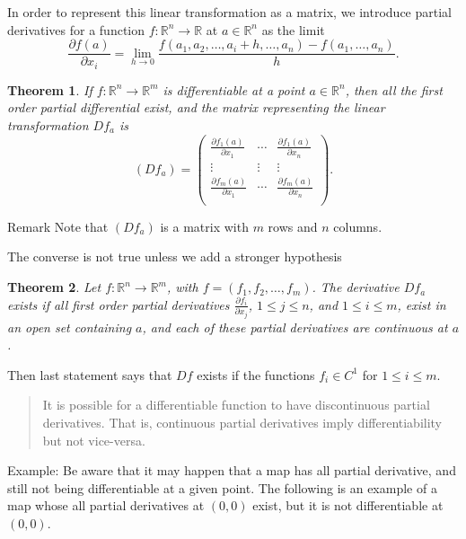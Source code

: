 \documentclass{amsart}
\newtheorem{thm}{Theorem}
\begin{document}
In order to represent this linear transformation as a matrix, we introduce partial derivatives for a function \(f: \mathbb{R}^n \to \mathbb{R}\) at \(a \in \mathbb{R}^n\) as the limit
\[ \frac{\partial f(a)}{\partial x_i} = \lim_{h\to 0} \frac{f(a_1,a_2,\ldots, a_i + h, \ldots, a_n) - f(a_1,\ldots, a_n)}{h}.\]


\begin{thm}
If \(f:\mathbb{R}^n \to \mathbb{R}^m\) is differentiable at a point \(a\in \mathbb{R}^n\), then all the first order partial differential exist, and the matrix representing the linear transformation \(Df_a\) is 
\[ (Df_a) = \left( \begin{array}{ccc}
\frac{\partial f_1(a)}{\partial x_1} & \cdots & \frac{\partial f_1(a)}{\partial x_n}\\
\vdots & \vdots & \vdots  \\
\frac{\partial f_m(a)}{\partial x_1} & \cdots & \frac{\partial f_m(a)}{\partial x_n}\\
\end{array} \right). \]
\end{thm}

\alert{Remark} Note that \((Df_a)\)  is a matrix with \(m\) rows and \(n\) columns.

The converse is not true unless we add a stronger hypothesis 

\begin{thm}
Let \(f:\mathbb{R}^n \to \mathbb{R}^m\), with \(f= (f_1,f_2,\ldots,f_m)\). The derivative  \(Df_a\) exists if all first order partial derivatives \(\frac{\partial f_i}{\partial x_j}\), \(1\leq j \leq n\), and \(1\leq i \leq m\), exist in an open set containing \(a\), and each of these partial derivatives are continuous at \(a\).
\end{thm}

Then last statement says that \(Df\) exists if the functions \(f_i \in C^{1}\) for \(1\leq i \leq m\).

\begin{quote}
It is possible for a differentiable function to have discontinuous partial derivatives. That is, continuous partial derivatives imply differentiability but not vice-versa.
\end{quote}

Example: Be aware that it may happen that a map has all partial derivative, and still not being differentiable at a given point. The following is an example of a map whose all
partial derivatives at \((0,0)\) exist, but it is not differentiable at \((0,0)\).
\end{document}
